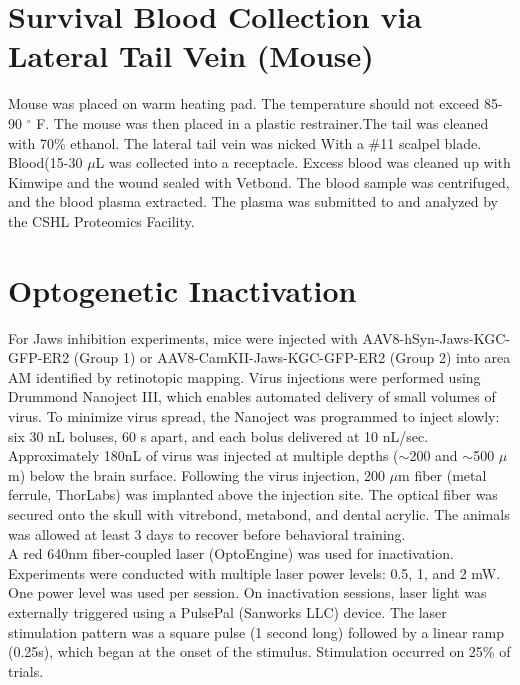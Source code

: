 \section{Survival Blood Collection via Lateral Tail Vein (Mouse)}
Mouse was placed on warm heating pad. The temperature should not exceed 85-90 $^\circ$ F. The mouse was then placed in a plastic restrainer.The tail was cleaned with 70\% ethanol. The lateral tail vein was nicked With a \#11 scalpel blade. Blood(15-30 $\mu$L was collected into a receptacle. Excess blood was cleaned up with Kimwipe and the wound sealed with Vetbond. The blood sample was centrifuged, and the blood plasma extracted. The plasma was submitted to and analyzed by the CSHL Proteomics Facility. 

\section{Optogenetic Inactivation}
For Jaws inhibition experiments, mice were injected with AAV8-hSyn-Jaws-KGC-GFP-ER2 (Group 1) or AAV8-CamKII-Jaws-KGC-GFP-ER2 (Group 2) into area AM identified by retinotopic mapping. Virus injections were performed using Drummond Nanoject III, which enables automated delivery of small volumes of virus. To minimize virus spread, the Nanoject was programmed to inject slowly: six 30 nL boluses, 60 s apart, and each bolus delivered at 10 nL/sec.
Approximately 180nL of virus was injected at multiple depths ($\sim$200 and $\sim$500 $\mu $m) below the brain surface. Following the virus injection, 200 $\mu$m fiber (metal ferrule, ThorLabs) was implanted above the injection site. The optical fiber was secured onto the skull with vitrebond, metabond, and dental acrylic. The animals was allowed at least 3 days to recover before behavioral training. \\
A red 640nm fiber-coupled laser (OptoEngine) was used for inactivation. Experiments were conducted with multiple laser power levels: 0.5, 1, and 2 mW. One power level was used per session. On inactivation sessions, laser light was externally triggered using a PulsePal (Sanworks LLC) device. The laser stimulation pattern was a square pulse (1 second long) followed by a linear ramp (0.25s), which began at the onset of the stimulus. Stimulation occurred on 25\% of trials. 




